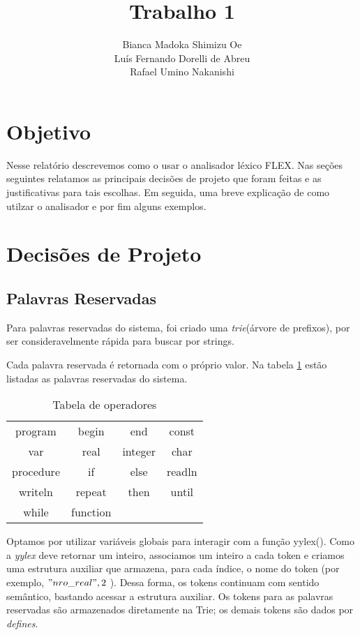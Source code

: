 \documentclass {article}
\title {Trabalho 1}
\author {Bianca Madoka Shimizu Oe \\ 
		Luís Fernando Dorelli de Abreu \\  
		Rafael Umino Nakanishi}
\begin{document}
\titlepage
\maketitle

\section{Objetivo}
	Nesse relatório descrevemos como o usar o analisador léxico FLEX. Nas seções seguintes relatamos as principais decisões de projeto que foram feitas e as justificativas para tais escolhas. Em seguida, uma breve explicação de como utilzar o analisador e por fim alguns exemplos.
	
\section{Decisões de Projeto}
	\subsection{Palavras Reservadas}
		Para palavras reservadas do sistema, foi criado uma \emph{trie}(árvore de prefixos), por ser consideravelmente rápida para buscar por strings.
		
		Cada palavra reservada é retornada com o próprio valor. Na tabela \ref{tb_pr} estão listadas as palavras reservadas do sistema.
		\begin{table}[ht]
		
		\centering
		\begin{tabular}{cccc}
			\toprule
			program & begin & end & const \\
			var & real & integer& char\\
			procedure & if & else & readln \\
			writeln & repeat & then & until\\
			while & function & & \\
			\bottomrule
		\end{tabular}
		\caption{Tabela de operadores}
		\label{tb_pr}
		
		\end{table}

	Optamos por utilizar variáveis globais para interagir com a função yylex(). Como a \emph{yylex} deve retornar um inteiro, associamos um inteiro a cada token e criamos uma estrutura auxiliar que armazena, para cada índice, o nome do token (por exemplo, $"nro\_real" , 2$ ). Dessa forma, os tokens continuam com sentido semântico, bastando acessar a estrutura auxiliar. Os tokens para as palavras reservadas são armazenados diretamente na Trie; os demais tokens são dados por \emph{defines}.
		
\end{document}
